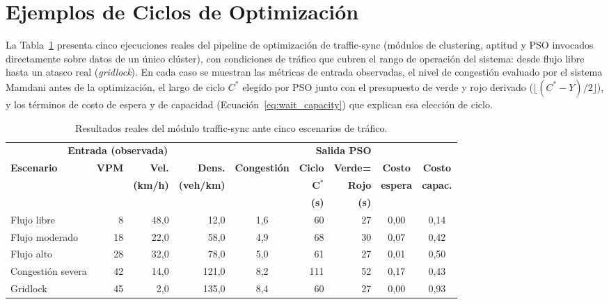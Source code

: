 \section{Ejemplos de Ciclos de Optimización}
\label{subsec:sync_ejemplos}

La Tabla~\ref{tab:sync_ejemplos} presenta cinco ejecuciones reales del pipeline de optimización de traffic-sync (módulos de clustering, aptitud y PSO invocados directamente sobre datos de un único clúster), con condiciones de tráfico que cubren el rango de operación del sistema: desde flujo libre hasta un atasco real (\emph{gridlock}). En cada caso se muestran las métricas de entrada observadas, el nivel de congestión evaluado por el sistema Mamdani antes de la optimización, el largo de ciclo $C^*$ elegido por PSO junto con el presupuesto de verde y rojo derivado ($\lfloor (C^*-Y)/2 \rfloor$), y los términos de costo de espera y de capacidad (Ecuación~\ref{eq:wait_capacity}) que explican esa elección de ciclo.

\begin{table}[htbp]
\centering
\caption{Resultados reales del módulo traffic-sync ante cinco escenarios de tráfico.}
\label{tab:sync_ejemplos}
\renewcommand{\arraystretch}{1.3}
\footnotesize
\setlength{\tabcolsep}{4pt}
\begin{tabular}{lrrrcrrcc}
\toprule
\multicolumn{4}{c}{\textbf{Entrada (observada)}} & \multicolumn{5}{c}{\textbf{Salida PSO}} \\
\cmidrule(lr){1-4} \cmidrule(lr){5-9}
\textbf{Escenario} & \textbf{VPM} & \textbf{Vel.} & \textbf{Dens.} & \multirow{3}{*}{\textbf{Congestión}} & \textbf{Ciclo} & \textbf{Verde=} & \textbf{Costo} & \textbf{Costo} \\
                   &              & \textbf{(km/h)} & \textbf{(veh/km)} & & $\mathbf{C^*}$ & \textbf{Rojo} & \textbf{espera} & \textbf{capac.} \\
                   &              &                 &                   & & \textbf{(s)} & \textbf{(s)} &                 &                 \\
\midrule
Flujo libre       &  8 & 48,0 &  12,0 & 1,6 &  60 & 27 & 0,00 & 0,14 \\
Flujo moderado    & 18 & 22,0 &  58,0 & 4,9 &  68 & 30 & 0,07 & 0,42 \\
Flujo alto        & 28 & 32,0 &  78,0 & 5,0 &  61 & 27 & 0,01 & 0,50 \\
Congestión severa & 42 & 14,0 & 121,0 & 8,2 & 111 & 52 & 0,17 & 0,43 \\
Gridlock          & 45 &  2,0 & 135,0 & 8,4 &  60 & 27 & 0,00 & 0,93 \\
\bottomrule
\end{tabular}
\end{table}

